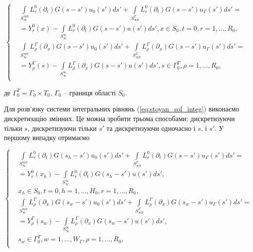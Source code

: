 \begin{equation}
\label{eq:stoyan_sol_integ}
\left\{
\begin{alignedat}{2}
&\int\limits_{S_\infty^{\infty 0}} L_r^0(\partial_t) G(s - s')u_0(s')ds' +
 \int\limits_{S_{\infty 0}^{T}} L_r^0(\partial_t) G(s - s')u_\Gamma(s')ds' = \\
& = Y_r^0(x) - \int\limits_{S_\infty^\infty}L_r^0(\partial_t)G(s-s')u(s')ds', x\in S_0,t=0,r=1,\ldots,R_0,\\
&\int\limits_{S_\infty^{\infty 0}} L_\rho^\Gamma(\partial_x) G(s - s')u_0(s')ds' +
 \int\limits_{S_{\infty 0}^{T}} L_\rho^\Gamma(\partial_x) G(s - s')u_\Gamma(s')ds' = \\
& = Y_\rho^\Gamma(s) - \int\limits_{S_\infty^\infty}L_\rho^\Gamma(\partial_x)G(s-s')u(s')ds', s\in \Gamma_0^T,\rho=1,\ldots,R_0,\\
\end{alignedat}
\right.
\end{equation}

де $\Gamma_0^T=\Gamma_0\times T_0$, $\Gamma_0$ – границя області $S_0$.

Для розв’язку системи інтегральних рівнянь (\ref{eq:stoyan_sol_integ}) виконаємо дискретизацію  змінних. Це можна зробити
трьома способами: дискретизуючи тільки $s$, дискретизуючи тільки $s'$ та дискретизуючи одночасно і $s$, і $s'$.
У першому випадку отримаємо

\begin{equation}
\label{eq:stoyan_sol_integ_s_first}
\left\{
\begin{alignedat}{2}
&\int\limits_{S_\infty^{\infty 0}} L_r^0(\partial_t) G(s_h - s')u_0(s')ds' +
 \int\limits_{S_{\infty 0}^{T}} L_r^0(\partial_t) G(s - s')u_\Gamma(s')ds' = \\
& = Y_r^0(x_h) - \int\limits_{S_\infty^\infty}L_r^0(\partial_t)G(s_h-s')u(s')ds', \\
 &x_h\in S_0,t=0,h=1,\ldots,H_0,r=1,\ldots,R_0,\\
&\int\limits_{S_\infty^{\infty 0}} L_\rho^\Gamma(\partial_x) G(s_w - s')u_0(s')ds' +
 \int\limits_{S_{\infty 0}^{T}} L_\rho^\Gamma(\partial_x) G(s_w - s')u_\Gamma(s')ds' = \\
& = Y_\rho^\Gamma(s_w) - \int\limits_{S_\infty^\infty}L_\rho^\Gamma(\partial_x)G(s_w-s')u(s')ds',\\
 &s_w\in \Gamma_0^T,w=1,\ldots,W_\Gamma,\rho=1,\ldots,R_0,\\
\end{alignedat}
\right.
\end{equation}

